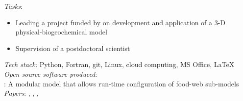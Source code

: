 \documentclass[
	a4paper,
]{fortysecondscv}
\begin{document}
\newpage



{\Huge\color{maincolor}\cvname}
\vspace*{-10mm}

\cvsection{}
\begin{cvtable}[1.0]

	{\href{https://www.hereon.de/}{\color{pblue}{Helmholtz-Zentrum Hereon, Germany}}}
	{\textit{Tasks}:
	\begin{itemize}[topsep=0pt,itemsep=0pt,partopsep=0pt, parsep=0pt, leftmargin=*]
     \item Leading a project funded by \href{https://www.umweltbundesamt.de/en}{\color{pblue}{UBA}} on development and application of a 3-D physical-biogeochemical model %
        \item Supervision of a postdoctoral scientist
    \end{itemize}
      \textit{Tech stack:} Python, Fortran, git, Linux, cloud computing, MS Office, \LaTeX\\
      \textit{Open-source software produced}:\\
      \href{https://github.com/OnurKerimoglu/FABM-GPM}{\color{pblue}{FABM-GPM}}: A modular model that allows run-time configuration of food-web sub-models\\
      \textit{Papers}:
      \href{https://doi.org/10.1029/2019JC015987}{\color{pblue}{1}}, %
      \href{https://doi.org/10.5194/bg-17-5097-2020}{\color{pblue}{2}}, %
      \href{https://doi.org/10.3389/fmars.2021.596126}{\color{pblue}{3}}, %
      \href{https://doi.org/10.3389/fmars.2021.637483}{\color{pblue}{4}} %
      }
      

\end{cvtable}
\end{document}
